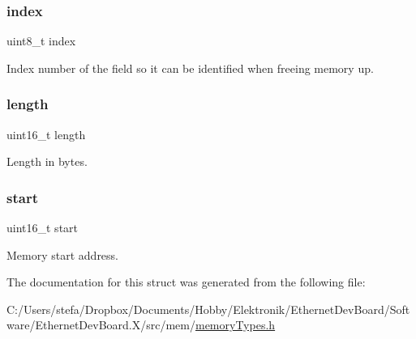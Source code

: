 \subsubsection{\texorpdfstring{index}{index}}
{\footnotesize\ttfamily uint8\+\_\+t index}



Index number of the field so it can be identified when freeing memory up. 

\mbox{\label{structmemory_field_a1892eba2086d12ac2b09005aeb09ea3b}} 
\subsubsection{\texorpdfstring{length}{length}}
{\footnotesize\ttfamily uint16\+\_\+t length}



Length in bytes. 

\mbox{\label{structmemory_field_a171a2b5d11b1a5891c38a98ac731a161}} 
\subsubsection{\texorpdfstring{start}{start}}
{\footnotesize\ttfamily uint16\+\_\+t start}



Memory start address. 



The documentation for this struct was generated from the following file\+:\begin{DoxyCompactItemize}
\item 
C\+:/\+Users/stefa/\+Dropbox/\+Documents/\+Hobby/\+Elektronik/\+Ethernet\+Dev\+Board/\+Software/\+Ethernet\+Dev\+Board.\+X/src/mem/\mbox{\hyperlink{memory_types_8h}{memory\+Types.\+h}}\end{DoxyCompactItemize}

